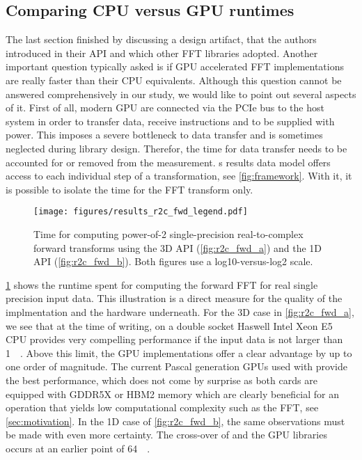 \subsection{Comparing CPU versus GPU runtimes}
\label{ssec:cpu_vs_gpu}

The last section finished by discussing a design artifact, that the \fftw{} authors introduced in their API and which other FFT libraries adopted. Another important question typically asked is if GPU accelerated FFT implementations are really faster than their CPU equivalents. Although this question cannot be answered comprehensively in our study, we would like to point out several aspects of it. First of all, modern GPU are connected via the PCIe bus to the host system in order to transfer data, receive instructions and to be supplied with power. This imposes a severe bottleneck to data transfer and is sometimes neglected during library design. Therefor, the time for data transfer needs to be accounted for or removed from the measurement. \gearshifft{}s results data model offers access to each individual step of a transformation, see \cref{fig:framework}. With it, it is possible to isolate the time for the FFT transform only.

\begin{figure}[!tbp]
  \centering
  \texttt{[image: figures/results\_r2c\_fwd\_legend.pdf]}\vspace{-1em}
  \hfill
  \caption{Time for computing power-of-2 single-precision real-to-complex forward transforms using the 3D API (\cref{fig:r2c_fwd_a}) and the 1D API \clfft{} (\cref{fig:r2c_fwd_b}). Both figures use a log10-versus-log2 scale.}
  \label{fig:r2c_fwd}
\end{figure}

\cref{fig:r2c_fwd} shows the runtime spent for computing the forward FFT for real single precision input data. This illustration is a direct measure for the quality of the implmentation and the hardware underneath. For the 3D case in \cref{fig:r2c_fwd_a}, we see that at the time of writing, \fftw{} on a double socket Haswell Intel Xeon E5 CPU provides very compelling performance if the input data is not larger than \SI{1}{\mebi\byte}. Above this limit, the GPU implementations offer a clear advantage by up to one order of magnitude. The current Pascal generation GPUs used with \cufft{} provide the best performance, which does not come by surprise as both cards are equipped with GDDR5X or HBM2 memory which are clearly beneficial for an operation that yields low computational complexity such as the FFT, see \cref{sec:motivation}. In the 1D case of \cref{fig:r2c_fwd_b}, the same observations must be made with even more certainty. The cross-over of \fftw{} and the GPU libraries occurs at an earlier point of \SI{64}{\kibi\byte}.  

